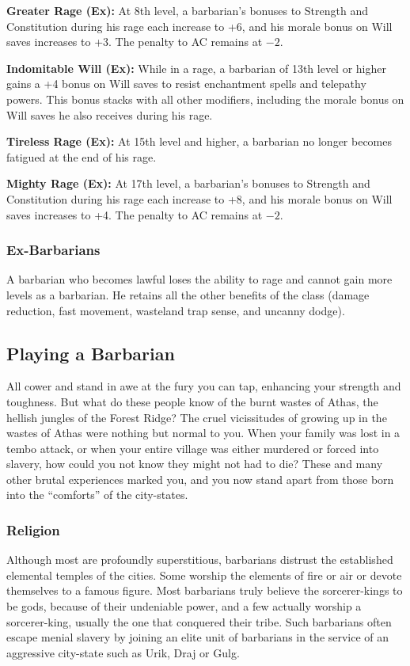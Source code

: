 \textbf{Greater Rage (Ex):} At 8th level, a barbarian's bonuses to Strength and Constitution during his rage each increase to +6, and his morale bonus on Will saves increases to +3. The penalty to AC remains at $-2$.

\textbf{Indomitable Will (Ex):} While in a rage, a barbarian of 13th level or higher gains a +4 bonus on Will saves to resist enchantment spells and telepathy powers. This bonus stacks with all other modifiers, including the morale bonus on Will saves he also receives during his rage.

\textbf{Tireless Rage (Ex):} At 15th level and higher, a barbarian no longer becomes fatigued at the end of his rage.

\textbf{Mighty Rage (Ex):} At 17th level, a barbarian's bonuses to Strength and Constitution during his rage each increase to +8, and his morale bonus on Will saves increases to +4. The penalty to AC remains at $-2$.

\subsubsection{Ex-Barbarians}
A barbarian who becomes lawful loses the ability to rage and cannot gain more levels as a barbarian. He retains all the other benefits of the class (damage reduction, fast movement, wasteland trap sense, and uncanny dodge).


\subsection{Playing a Barbarian}
All cower and stand in awe at the fury you can tap, enhancing your strength and toughness. But what do these people know of the burnt wastes of Athas, the hellish jungles of the Forest Ridge? The cruel vicissitudes of growing up in the wastes of Athas were nothing but normal to you. When your family was lost in a tembo attack, or when your entire village was either murdered or forced into slavery, how could you not know they might not had to die? These and many other brutal experiences marked you, and you now stand apart from those born into the ``comforts'' of the city-states.

\subsubsection{Religion}
Although most are profoundly superstitious, barbarians distrust the established elemental temples of the cities. Some worship the elements of fire or air or devote themselves to a famous figure. Most barbarians truly believe the sorcerer-kings to be gods, because of their undeniable power, and a few actually worship a sorcerer-king, usually the one that conquered their tribe. Such barbarians often escape menial slavery by joining an elite unit of barbarians in the service of an aggressive city-state such as Urik, Draj or Gulg.

